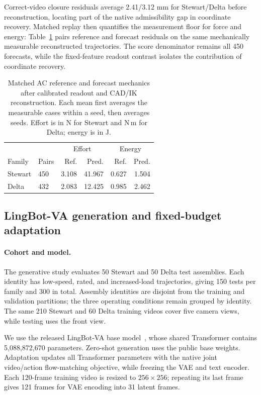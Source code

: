 Correct-video closure residuals average 2.41/3.12 mm for Stewart/Delta before reconstruction, locating part of the native admissibility gap in coordinate recovery. Matched replay then quantifies the measurement floor for force and energy: Table~\ref{app:ac-reference} pairs reference and forecast residuals on the same mechanically measurable reconstructed trajectories. The score denominator remains all 450 forecasts, while the fixed-feature readout contrast isolates the contribution of coordinate recovery.

\begin{table}[t]
\caption{Matched AC reference and forecast mechanics after calibrated readout and CAD/IK reconstruction. Each mean first averages the measurable cases within a seed, then averages seeds. Effort is in N for Stewart and N\,m for Delta; energy is in J.}
\label{app:ac-reference}
\centering\footnotesize
\setlength{\tabcolsep}{3pt}
\begin{tabular}{llrrrr}
\toprule
& & \multicolumn{2}{c}{Effort} & \multicolumn{2}{c}{Energy}\\
Family & Pairs & Ref. & Pred. & Ref. & Pred.\\
\midrule
Stewart & 450 & 3.108 & 41.967 & 0.627 & 1.504 \\
Delta & 432 & 2.083 & 12.425 & 0.985 & 2.462 \\
\bottomrule
\end{tabular}
\end{table}

\subsection{LingBot-VA generation and fixed-budget adaptation}
\label{app:lingbot}
\paragraph{Cohort and model.}
The generative study evaluates 50 Stewart and 50 Delta test assemblies. Each identity has low-speed, rated, and increased-load trajectories, giving 150 tests per family and 300 in total. Assembly identities are disjoint from the training and validation partitions; the three operating conditions remain grouped by identity. The same 210 Stewart and 60 Delta training videos cover five camera views, while testing uses the front view.

We use the released LingBot-VA base model~\cite{li2026causal}, whose shared Transformer contains 5,088,872,670 parameters. Zero-shot generation uses the public base weights. Adaptation updates all Transformer parameters with the native joint video/action flow-matching objective, while freezing the VAE and text encoder. Each 120-frame training video is resized to $256\times256$; repeating its last frame gives 121 frames for VAE encoding into 31 latent frames.


